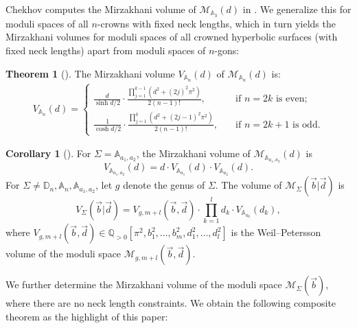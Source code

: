 \documentclass{amsart}
\theoremstyle{definition}
\newtheorem{corollary}[proposition]{Corollary}
\newtheorem{theorem}[proposition]{Theorem}
\begin{document}
Chekhov computes the Mirzakhani volume of $\mathcal{M}_{\mathbb{A}_{3}}(d)$ in \cite[2.5.1]{chekhov2024}. We generalize this for moduli spaces of all $n$-crowns with fixed neck lengths, which in turn yields the Mirzakhani volumes for moduli spaces of all crowned hyperbolic surfaces (with fixed neck lengths) apart from moduli spaces of $n$-gons:


\begin{theorem}
[]
\label{thm:fixedneckvol-intro}
The Mirzakhani volume $V_{\mathbb{A}_n}(d)$ of $\mathcal{M}_{\mathbb{A}_n}(d)$ is:
\begin{align*}
V_{\mathbb{A}_n}(d) 
=
\left\{
\begin{array}{rl}
\frac{d}{\sinh{d/2}} \cdot 
\frac{\prod_{j=1}^{k-1} (d^2+(2j)^2\pi^2)}{2(n-1)!},
&\quad\text{if }n=2k\text{ is even;}
\\[0.25em]
\frac{1}{\cosh{d/2}} \cdot  \frac{\prod_{j=1}^{k} (d^2+(2j-1)^2\pi^2 )}{2(n-1)!},
&\quad\text{if }n = 2k+1\text{ is odd.}
\end{array}
\right.
\end{align*}

\end{theorem}


\begin{corollary}[]
\label{cor:fixedneckvolumegeneral-intro}
    For $\Sigma=\mathbb{A}_{a_1,a_2}$, the Mirzakhani volume of $\mathcal{M}_{\mathbb{A}_{a_1,a_2}}(d)$ is
    \[
    V_{\mathbb{A}_{a_1,a_2}}(d)
    =
    d\cdot V_{\mathbb{A}_{a_1}}(d)\cdot V_{\mathbb{A}_{a_2}}(d).
    \]
    For $\Sigma\neq\mathbb{D}_n,\mathbb{A}_n,\mathbb{A}_{a_1,a_2}$, let $g$ denote the genus of $\Sigma$. The volume of $\mathcal{M}_\Sigma(\vec{b}|\vec{d})$ is
    \[
    V_\Sigma(\vec{b}|\vec{d})
    =
    V_{g,m+l}(\vec{b},\vec{d})
    \cdot
    \prod_{k=1}^{l}d_k \cdot V_{\mathbb{A}_{a_k}}(d_k),
    \]
    where $V_{g,m+l}(\vec{b},\vec{d})\in\mathbb{Q}_{>0}[\pi^2,b_1^2,\ldots,b_m^2,d_1^2,\ldots,d_l^2]$ is the Weil--Petersson volume of the moduli space $\mathcal{M}_{g,m+l}(\vec{b},\vec{d})$.
\end{corollary}



We further determine the Mirzakhani volume of the moduli space $\mathcal{M}_\Sigma(\vec{b})$, where there are no neck length constraints. We obtain the following composite theorem as the highlight of this paper:
\end{document}
